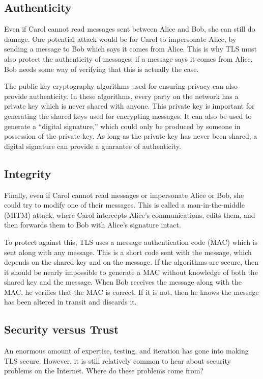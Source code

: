 \subsection{Authenticity}

Even if Carol cannot read messages sent between Alice and Bob, she can still do damage. One potential attack would be for Carol to impersonate Alice, by sending a message to Bob which says it comes from Alice. This is why TLS must also protect the authenticity of messages: if a message says it comes from Alice, Bob needs some way of verifying that this is actually the case.

The public key cryptography algorithms used for ensuring privacy can also provide authenticity. In these algorithms, every party on the network has a private key which is never shared with anyone. This private key is important for generating the shared keys used for encrypting messages. It can also be used to generate a ``digital signature,'' which could only be produced by someone in possession of the private key. As long as the private key has never been shared, a digital signature can provide a guarantee of authenticity.

\subsection{Integrity}

Finally, even if Carol cannot read messages or impersonate Alice or Bob, she could try to modify one of their messages. This is called a man-in-the-middle (MITM) attack, where Carol intercepts Alice's communications, edits them, and then forwards them to Bob with Alice's signature intact.

To protect against this, TLS uses a message authentication code (MAC) which is sent along with any message. This is a short code sent with the message, which depends on the shared key and on the message. If the algorithms are secure, then it should be nearly impossible to generate a MAC without knowledge of both the shared key and the message. When Bob receives the message along with the MAC, he verifies that the MAC is correct. If it is not, then he knows the message has been altered in transit and discards it.

\subsection{Security versus Trust}

An enormous amount of expertise, testing, and iteration has gone into making TLS secure. However, it is still relatively common to hear about security problems on the Internet. Where do these problems come from?

